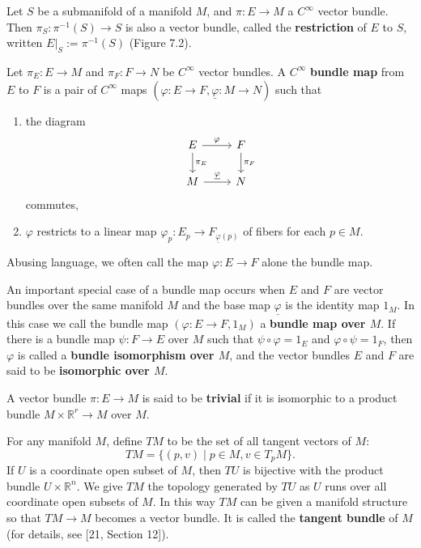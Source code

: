 \begin{example}
Let $S$ be a submanifold of a manifold $M$, and $\pi : E \to M$ a $C^{\infty}$ vector bundle. Then $\pi_S : \pi^{-1}(S) \to S$ is also a vector bundle, called the \textbf{restriction} of $E$ to $S$, written $E|_S := \pi^{-1}(S)$ (Figure 7.2).


\begin{definition}
Let $\pi_E : E \to M$ and $\pi_F : F \to N$ be $C^{\infty}$ vector bundles. A $C^{\infty}$ \textbf{bundle map} from $E$ to $F$ is a pair of $C^{\infty}$ maps $(\varphi : E \to F, \underline{\varphi} : M \to N)$ such that
\begin{enumerate}[label=(\roman*)]
    \item the diagram
    \[
    \begin{tikzcd}
    E \arrow[r, "\varphi"] \arrow[d, "\pi_E"] & F \arrow[d, "\pi_F"] \\
    M \arrow[r, "\underline{\varphi}"] & N
    \end{tikzcd}
    \]
    commutes,
    \item $\varphi$ restricts to a linear map $\varphi_p : E_p \to F_{\underline{\varphi}(p)}$ of fibers for each $p \in M$.
\end{enumerate}
Abusing language, we often call the map $\varphi : E \to F$ alone the bundle map.
\end{definition}

An important special case of a bundle map occurs when $E$ and $F$ are vector bundles over the same manifold $M$ and the base map $\underline{\varphi}$ is the identity map $1_M$. In this case we call the bundle map $(\varphi : E \to F, 1_M)$ a \textbf{bundle map over $M$}. If there is a bundle map $\psi : F \to E$ over $M$ such that $\psi \circ \varphi = 1_E$ and $\varphi \circ \psi = 1_F$, then $\varphi$ is called a \textbf{bundle isomorphism over $M$}, and the vector bundles $E$ and $F$ are said to be \textbf{isomorphic over $M$}.

\begin{definition}
A vector bundle $\pi : E \to M$ is said to be \textbf{trivial} if it is isomorphic to a product bundle $M \times \mathbb{R}^r \to M$ over $M$.
\end{definition}

\begin{example}
For any manifold $M$, define $TM$ to be the set of all tangent vectors of $M$:
\[
TM = \{(p,v) \mid p \in M, v \in T_p M\}.
\]
If $U$ is a coordinate open subset of $M$, then $TU$ is bijective with the product bundle $U \times \mathbb{R}^n$. We give $TM$ the topology generated by $TU$ as $U$ runs over all coordinate open subsets of $M$. In this way $TM$ can be given a manifold structure so that $TM \to M$ becomes a vector bundle. It is called the \textbf{tangent bundle} of $M$ (for details, see [21, Section 12]).
\end{example}


\end{example}
